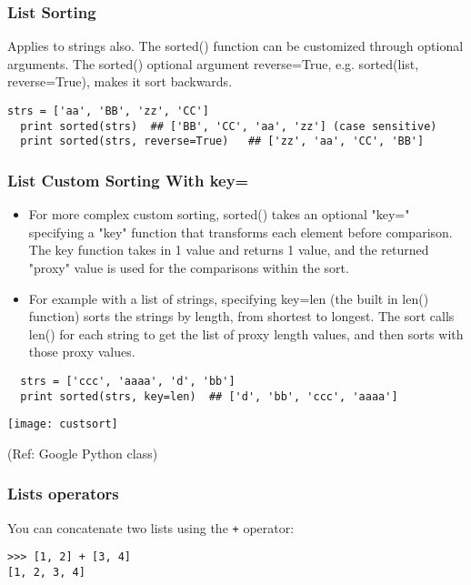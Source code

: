 \begin{frame}[fragile]\frametitle{List Sorting}

Applies to strings also. The sorted() function can be customized through optional arguments. The sorted() optional argument reverse=True, e.g. sorted(list, reverse=True), makes it sort backwards.

\begin{lstlisting}
strs = ['aa', 'BB', 'zz', 'CC']
  print sorted(strs)  ## ['BB', 'CC', 'aa', 'zz'] (case sensitive)
  print sorted(strs, reverse=True)   ## ['zz', 'aa', 'CC', 'BB']
\end{lstlisting}

\end{frame}

\begin{frame}[fragile]\frametitle{List Custom Sorting With key=}

\begin{itemize}
\item For more complex custom sorting, sorted() takes an optional "key=" specifying a "key" function that transforms each element before comparison. The key function takes in 1 value and returns 1 value, and the returned "proxy" value is used for the comparisons within the sort.

\item For example with a list of strings, specifying key=len (the built in len() function) sorts the strings by length, from shortest to longest. The sort calls len() for each string to get the list of proxy length values, and then sorts with those proxy values.
\end{itemize}

\begin{lstlisting}
  strs = ['ccc', 'aaaa', 'd', 'bb']
  print sorted(strs, key=len)  ## ['d', 'bb', 'ccc', 'aaaa']
\end{lstlisting}

\begin{center}
\texttt{[image: custsort]}
\end{center}

\tiny{(Ref: Google Python class)}
\end{frame}


\begin{frame}[fragile]\frametitle{Lists operators}
  You can concatenate two lists using the \texttt{+} operator:
  \begin{lstlisting}
>>> [1, 2] + [3, 4]
[1, 2, 3, 4]
  \end{lstlisting}
\end{frame}


